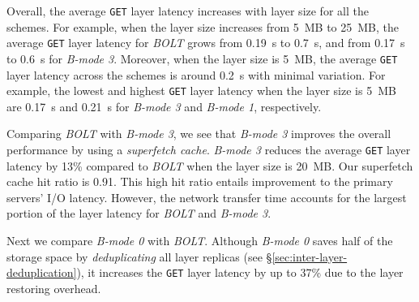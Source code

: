 Overall, the average \texttt{GET} layer latency increases with layer size for
all the schemes.
%
For example, when the layer size increases from 5~MB to
25~MB, the average \texttt{GET} layer latency for \emph{BOLT} grows from 0.19~s
to 0.7~s, and from 0.17~s to 0.6~s for \emph{B-mode 3}.
%
Moreover, when the
layer size is 5~MB, the average \texttt{GET} layer latency across the
schemes is around 0.2~s with minimal variation.
%
For example, the
lowest and highest \texttt{GET} layer latency when the layer size is 5~MB are
0.17~s and 0.21~s for \emph{B-mode 3} and \emph{B-mode 1}, respectively.



Comparing \emph{BOLT} with \emph{B-mode 3}, we see that \emph{B-mode 3}
improves the overall performance by using a \emph{superfetch cache}.
%
\emph{B-mode 3} reduces the average \texttt{GET} layer latency by 13\% compared to
\emph{BOLT} when the layer size is 20~MB.
%
Our superfetch cache hit ratio is 0.91.
%
This high hit ratio entails improvement to the primary servers' I/O
latency.
%
However, the network transfer time accounts for the largest portion of
the  layer latency for \emph{BOLT} and \emph{B-mode 3}.



Next we compare \emph{B-mode 0} with \emph{BOLT}.
%
Although \emph{B-mode 0}
saves half of the storage space by \emph{deduplicating} all layer replicas (see
\S\ref{sec:inter-layer-deduplication}), it increases the \texttt{GET}
layer latency by up to 37\% due to the layer restoring overhead.

